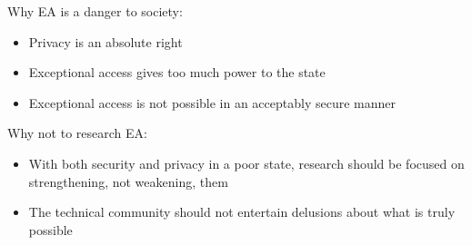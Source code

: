 Why EA is a danger to society:
\begin{itemize}
    \item Privacy is an absolute right
    \item Exceptional access gives too much power to the state
    \item Exceptional access is not possible in an acceptably secure manner
\end{itemize}

Why not to research EA:
\begin{itemize}
    \item With both security and privacy in a poor state, research should be focused on strengthening, not weakening,
            them
    \item The technical community should not entertain delusions about what is truly possible
\end{itemize}